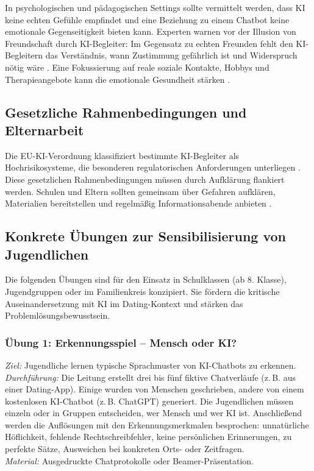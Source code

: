 \documentclass[12pt,a4paper,oneside]{scrartcl}
\begin{document}
	In psychologischen und pädagogischen Settings sollte vermittelt werden, dass KI keine echten Gefühle empfindet und eine Beziehung zu einem Chatbot keine emotionale Gegenseitigkeit bieten kann. Experten warnen vor der Illusion von Freundschaft durch KI-Begleiter: Im Gegensatz zu echten Freunden fehlt den KI-Begleitern das Verständnis, wann Zustimmung gefährlich ist und Widerspruch nötig wäre \cite{Stanford2025}. Eine Fokussierung auf reale soziale Kontakte, Hobbys und Therapieangebote kann die emotionale Gesundheit stärken \cite{Lebensbruecke2025}.
	
	\subsection{Gesetzliche Rahmenbedingungen und Elternarbeit}
	
	Die EU-KI-Verordnung klassifiziert bestimmte KI-Begleiter als Hochrisikosysteme, die besonderen regulatorischen Anforderungen unterliegen \cite{KJM2025}. Diese gesetzlichen Rahmenbedingungen müssen durch Aufklärung flankiert werden. Schulen und Eltern sollten gemeinsam über Gefahren aufklären, Materialien bereitstellen und regelmäßig Informationsabende anbieten \cite{TeacherPlus2025}.
	
	\subsection{Konkrete Übungen zur Sensibilisierung von Jugendlichen}
	
	Die folgenden Übungen sind für den Einsatz in Schulklassen (ab 8. Klasse), Jugendgruppen oder im Familienkreis konzipiert. Sie fördern die kritische Auseinandersetzung mit KI im Dating-Kontext und stärken das Problemlösungsbewusstsein.
	
	\subsubsection{Übung 1: Erkennungsspiel – Mensch oder KI?}
	\textit{Ziel:} Jugendliche lernen typische Sprachmuster von KI-Chatbots zu erkennen. \\
	\textit{Durchführung:} Die Leitung erstellt drei bis fünf fiktive Chatverläufe (z.\,B. aus einer Dating-App). Einige wurden von Menschen geschrieben, andere von einem kostenlosen KI-Chatbot (z.\,B. ChatGPT) generiert. Die Jugendlichen müssen einzeln oder in Gruppen entscheiden, wer Mensch und wer KI ist. Anschließend werden die Auflösungen mit den Erkennungsmerkmalen besprochen: unnatürliche Höflichkeit, fehlende Rechtschreibfehler, keine persönlichen Erinnerungen, zu perfekte Sätze, Ausweichen bei konkreten Orts- oder Zeitfragen. \\
	\textit{Material:} Ausgedruckte Chatprotokolle oder Beamer-Präsentation.
	
\end{document}
